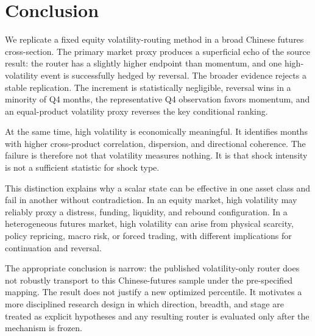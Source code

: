 \section{Conclusion}

We replicate a fixed equity volatility-routing method in a broad Chinese futures
cross-section. The primary market proxy produces a superficial echo of the source result:
the router has a slightly higher endpoint than momentum, and one high-volatility event is
successfully hedged by reversal. The broader evidence rejects a stable replication. The
increment is statistically negligible, reversal wins in a minority of Q4 months, the
representative Q4 observation favors momentum, and an equal-product volatility proxy
reverses the key conditional ranking.

At the same time, high volatility is economically meaningful. It identifies months with
higher cross-product correlation, dispersion, and directional coherence. The failure is
therefore not that volatility measures nothing. It is that shock intensity is not a
sufficient statistic for shock type.

This distinction explains why a scalar state can be effective in one asset class and fail
in another without contradiction. In an equity market, high volatility may reliably
proxy a distress, funding, liquidity, and rebound configuration. In a heterogeneous
futures market, high volatility can arise from physical scarcity, policy repricing,
macro risk, or forced trading, with different implications for continuation and reversal.

The appropriate conclusion is narrow: the published volatility-only router does not
robustly transport to this Chinese-futures sample under the pre-specified mapping. The
result does not justify a new optimized percentile. It motivates a more disciplined
research design in which direction, breadth, and stage are treated as explicit hypotheses
and any resulting router is evaluated only after the mechanism is frozen.

